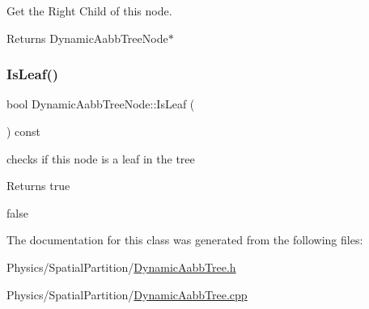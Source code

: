 Get the Right Child of this node. 

\begin{DoxyReturn}{Returns}
Dynamic\+Aabb\+Tree\+Node$\ast$ 
\end{DoxyReturn}
\mbox{\label{classDynamicAabbTreeNode_acc87f07be4469f565cb57928b9f06c5a}} 
\subsubsection{\texorpdfstring{Is\+Leaf()}{IsLeaf()}}
{\footnotesize\ttfamily bool Dynamic\+Aabb\+Tree\+Node\+::\+Is\+Leaf (\begin{DoxyParamCaption}{ }\end{DoxyParamCaption}) const}



checks if this node is a leaf in the tree 

\begin{DoxyReturn}{Returns}
true 

false 
\end{DoxyReturn}


The documentation for this class was generated from the following files\+:\begin{DoxyCompactItemize}
\item 
Physics/\+Spatial\+Partition/\hyperlink{DynamicAabbTree_8h}{Dynamic\+Aabb\+Tree.\+h}\item 
Physics/\+Spatial\+Partition/\hyperlink{DynamicAabbTree_8cpp}{Dynamic\+Aabb\+Tree.\+cpp}\end{DoxyCompactItemize}
